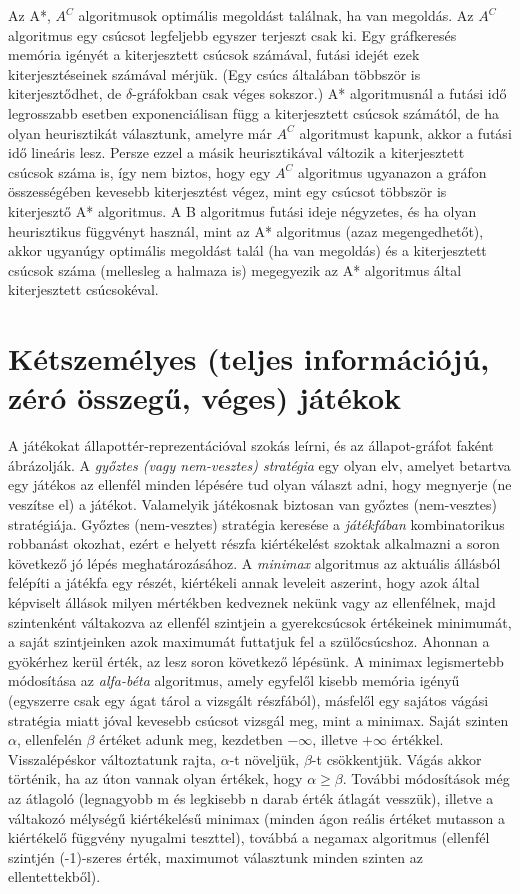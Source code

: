 \documentclass[margin=0px]{article}
\begin{document}
Az A*, $A^C$ algoritmusok optimális megoldást találnak, ha van megoldás. Az $A^C$ algoritmus egy csúcsot legfeljebb egyszer terjeszt csak ki.
Egy gráfkeresés memória igényét a kiterjesztett csúcsok számával, futási idejét ezek kiterjesztéseinek számával mérjük. (Egy csúcs általában többször is kiterjesztődhet, de $\delta$-gráfokban csak véges sokszor.) A* algoritmusnál a futási idő legrosszabb esetben exponenciálisan függ a kiterjesztett csúcsok számától, de ha olyan heurisztikát választunk, amelyre már $A^C$ algoritmust kapunk, akkor a futási idő lineáris lesz. Persze ezzel a másik heurisztikával változik a kiterjesztett csúcsok száma is, így nem biztos, hogy egy $A^C$ algoritmus ugyanazon a gráfon összességében kevesebb kiterjesztést végez, mint egy csúcsot többször is kiterjesztő A* algoritmus. A B algoritmus futási ideje négyzetes, és ha olyan heurisztikus függvényt használ, mint az A* algoritmus (azaz megengedhetőt), akkor ugyanúgy optimális megoldást talál (ha van megoldás) és a kiterjesztett csúcsok száma (mellesleg a halmaza is) megegyezik az A* algoritmus által kiterjesztett csúcsokéval.

\section{Kétszemélyes (teljes információjú, zéró összegű, véges) játékok}

A játékokat állapottér-reprezentációval szokás leírni, és az állapot-gráfot faként ábrázolják.
A \textit{győztes (vagy nem-vesztes) stratégia} egy olyan elv, amelyet betartva egy játékos az ellenfél minden lépésére tud olyan választ adni, hogy megnyerje (ne veszítse el) a játékot. Valamelyik játékosnak biztosan van győztes (nem-vesztes) stratégiája. Győztes (nem-vesztes) stratégia keresése a \textit{játékfában} kombinatorikus robbanást okozhat, ezért e helyett részfa kiértékelést szoktak alkalmazni a soron következő jó lépés meghatározásához.
A \textit{minimax} algoritmus az aktuális állásból felépíti a játékfa egy részét, kiértékeli annak leveleit aszerint, hogy azok által képviselt állások milyen mértékben kedveznek nekünk vagy az ellenfélnek, majd szintenként váltakozva az ellenfél szintjein a gyerekcsúcsok értékeinek minimumát, a saját szintjeinken azok maximumát futtatjuk fel a szülőcsúcshoz. Ahonnan a gyökérhez kerül érték, az lesz soron következő lépésünk.
A minimax legismertebb módosítása az \textit{alfa-béta} algoritmus, amely egyfelől kisebb memória igényű (egyszerre csak egy ágat tárol a vizsgált részfából), másfelől egy sajátos vágási stratégia miatt jóval kevesebb csúcsot vizsgál meg, mint a minimax. Saját szinten $\alpha$, ellenfelén $\beta$ értéket adunk meg, kezdetben $-\infty$, illetve $+\infty$ értékkel. Visszalépéskor változtatunk rajta, $\alpha$-t növeljük, $\beta$-t csökkentjük. Vágás akkor történik, ha az úton vannak olyan értékek, hogy $\alpha \geq \beta$.
További módosítások még az átlagoló (legnagyobb m és legkisebb n darab érték átlagát vesszük), illetve a váltakozó mélységű kiértékelésű minimax (minden ágon reális értéket mutasson a kiértékelő függvény nyugalmi teszttel), továbbá a negamax algoritmus (ellenfél szintjén (-1)-szeres érték, maximumot választunk minden szinten az ellentettekből).
\end{document}
